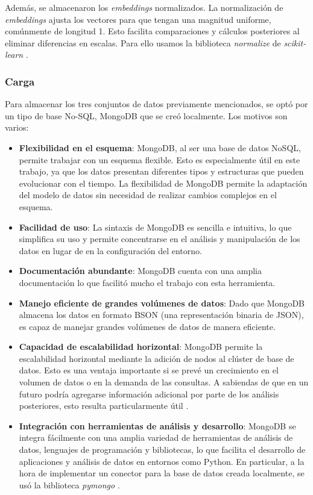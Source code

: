 \documentclass[11pt,a4paper,twoside,openany]{tesis}
\begin{document}
Además, se almacenaron los \emph{embeddings} normalizados. La normalización de \emph{embeddings} ajusta los vectores para que tengan una magnitud uniforme, comúnmente de longitud 1. Esto facilita comparaciones y cálculos posteriores al eliminar diferencias en escalas. Para ello usamos la biblioteca \emph{normalize} de \emph{scikit-learn} \cite{sklearn_normalize}.

\subsubsection{Carga} \textbf{ }

Para almacenar los tres conjuntos de datos previamente mencionados, se optó por un tipo de base No-SQL, MongoDB que se creó localmente. Los motivos son varios:
\begin{itemize}
    \item \textbf{Flexibilidad en el esquema}: MongoDB, al ser una base de datos NoSQL, permite trabajar con un esquema flexible. Esto es especialmente útil en este trabajo, ya que los datos presentan diferentes tipos y estructuras que pueden evolucionar con el tiempo. La flexibilidad de MongoDB permite la adaptación del modelo de datos sin necesidad de realizar cambios complejos en el esquema.
    
    \item \textbf{Facilidad de uso}: La sintaxis de MongoDB es sencilla e intuitiva, lo que simplifica su uso y permite concentrarse en el análisis y manipulación de los datos en lugar de en la configuración del entorno.
    
    \item \textbf{Documentación abundante}: MongoDB cuenta con una amplia documentación lo que facilitó mucho el trabajo con esta herramienta. 
    
    \item \textbf{Manejo eficiente de grandes volúmenes de datos}: Dado que MongoDB almacena los datos en formato BSON (una representación binaria de JSON), es capaz de manejar grandes volúmenes de datos de manera eficiente.
    
    \item \textbf{Capacidad de escalabilidad horizontal}: MongoDB permite la escalabilidad horizontal mediante la adición de nodos al clúster de base de datos. Esto es una ventaja importante si se prevé un crecimiento en el volumen de datos o en la demanda de las consultas. A sabiendas de que en un futuro podría agregarse información adicional por parte de los análisis posteriores, esto resulta particularmente útil \cite{MongoDB-docs}.
    
    \item \textbf{Integración con herramientas de análisis y desarrollo}: MongoDB se integra fácilmente con una amplia variedad de herramientas de análisis de datos, lenguajes de programación y bibliotecas, lo que facilita el desarrollo de aplicaciones y análisis de datos en entornos como Python. En particular, a la hora de implementar un conector para la base de datos creada localmente, se usó la biblioteca \emph{pymongo} \cite{pymongo}.
\end{itemize}
\end{document}
